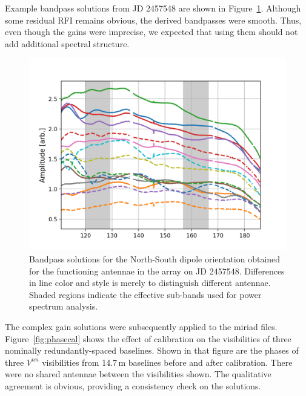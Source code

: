 \documentclass[twocolumn, trackchanges]{aastex61}
\begin{document}
Example bandpass solutions from JD 2457548 are shown in Figure~\ref{fig:bandpass}. Although some residual RFI remains obvious, the derived bandpasses were smooth. Thus, even though the gains were imprecise, we expected that using them should not add additional spectral structure. 

\begin{figure}
\centering
\includegraphics[scale=0.5]{h19_2457458_abs_smallzoom_nolegend.png}
\caption{Bandpass solutions for the North-South dipole orientation obtained for the functioning antennae in the array on JD 2457548. Differences in line color and style is merely to distinguish different antennae. Shaded regions indicate the effective sub-bands used for power spectrum analysis.}
\label{fig:bandpass}
\end{figure}

The complex gain solutions were subsequently applied to the {\sc miriad} files. Figure~\ref{fig:phasecal} shows the effect of calibration on the visibilities of three nominally redundantly-spaced baselines. Shown in that figure are the phases of three $V^{nn}$ visibilities from 14.7\,m baselines before and after calibration. There were no shared antennae between the visibilities shown. The qualitative agreement is obvious, providing a consistency check on the solutions.
\end{document}
